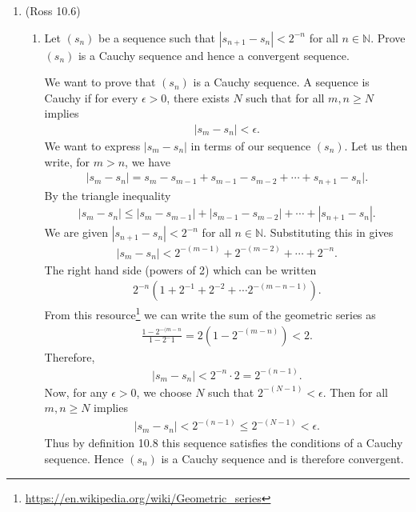 \documentclass [10pt]{article}
\newcommand{\jg}[1]{{\color{blue} #1}}
\begin{document}
\begin{enumerate}
\item (Ross 10.6)
\begin{enumerate}
\item Let $(s_n)$ be a sequence such that $|s_{n+1}-s_n| < 2^{-n}$ for all $n \in \mathbb{N}$.
Prove $(s_n)$ is a Cauchy sequence and hence a convergent
sequence.

\jg{
We want to prove that $(s_n)$ is a Cauchy sequence. A sequence is Cauchy if for every $\epsilon > 0$, there exists $N$ such that for all $m, n \geq N$ implies 
\begin{align*}
    |s_m - s_n| < \epsilon. 
\end{align*}
We want to express $|s_m - s_n|$ in terms of our sequence $(s_n)$. Let us then write, for $m > n$, we have 
\begin{align*}
    |s_m - s_n| = s_m - s_{m-1} + s_{m-1} - s_{m-2} + \cdots + s_{n+1} - s_n|. 
\end{align*}
By the triangle inequality 
\begin{align*}
    |s_m - s_n| \leq |s_m - s_{m-1}| + |s_{m-1} - s_{m-2}| + \cdots + |s_{n+1} - s_n|. 
\end{align*}
We are given $|s_{n+1} - s_n| < 2^{-n}$ for all $n \in \mathbb{N}$. Substituting this in gives
\begin{align*}
    |s_m - s_n| < 2^{-(m-1)} + 2^{-(m-2)} + \cdots + 2^{-n}. 
\end{align*}
The right hand side (powers of 2) which can be written 
\begin{align*}
    2^{-n} (1 + 2^{-1} + 2^{-2} + \cdots 2^{-(m-n-1)}).
\end{align*}
From this resource\footnote{\url{https://en.wikipedia.org/wiki/Geometric_series}} we can write the sum of the geometric series as 
\begin{align*}
    \frac{1-2^{-(m-n}}{1-2^-1} = 2(1-2^{-(m-n)}) < 2.
\end{align*}
Therefore, 
\begin{align*}
    |s_m
 - s_n| < 2^{-n} \cdot 2 = 2^{-(n-1)}. 
\end{align*}
Now, for any $\epsilon > 0$, we choose $N$ such that $2^{-(N-1)} < \epsilon$. Then for all $m,n \geq N$ implies 
\begin{align*}
    |s_m - s_n| < 2^{-(n-1)} \leq 2^{-(N-1)} < \epsilon. 
\end{align*}
Thus by definition 10.8 this sequence satisfies the conditions of a Cauchy sequence. Hence $(s_n)$ is a Cauchy sequence and is therefore convergent. 
\clearpage
}


\end{enumerate}
\end{enumerate}
\end{document}
